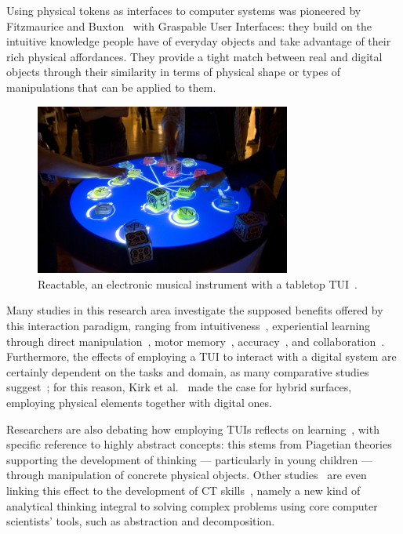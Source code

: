 Using physical tokens as interfaces to computer systems was pioneered by Fitzmaurice and Buxton~\cite{fitzmaurice1997graspable} with Graspable User Interfaces: they build on the intuitive knowledge people have of everyday objects and take advantage of their rich physical affordances. They provide a tight match between real and digital objects through their similarity in terms of physical shape or types of manipulations that can be applied to them.

\begin{figure}[ht!]
  \centering
  \includegraphics[width=0.75\textwidth]{images/c2/Reactable.jpg} 
  \caption{Reactable, an electronic musical instrument with a tabletop \acf{TUI}~\cite{jorda2007reactable}.}\label{fig:reactable}
\end{figure}

Many studies in this research area investigate the supposed benefits offered by this interaction paradigm, ranging from intuitiveness~\cite{Ishii:1997gy}, experiential learning through direct manipulation~\cite{Manches:2009kg, Parkes:2008bu}, motor memory~\cite{Weiss:2009ct}, accuracy~\cite{Muller:2014kx}, and collaboration~\cite{Subramanian:2007kx}. Furthermore, the effects of employing a \ac{TUI} to interact with a digital system are certainly dependent on the tasks and domain, as many comparative studies suggest~\cite{Weiss:2009ct, Muller:2014kx, Hancock:2009bg}; for this reason, Kirk et al.~\cite{Kirk:2009ue} made the case for hybrid surfaces, employing physical elements together with digital ones.

Researchers are also debating how em\-ploy\-ing \acp{TUI} re\-flects on learn\-ing~\cite{Horn:2009be,Marshall:2007dr,Antle:2013ho}, with spe\-cif\-ic ref\-er\-ence to highly abstract concepts: this stems from Piagetian theories~\cite{Piaget:1969vq} supporting the development of thinking --- particularly in young children --- through manipulation of concrete physical objects. Other studies~\cite{Wang:2014jy,Horn:2011ch} are even linking this effect to the development of \ac{CT} skills~\cite{Wing:2006iz}, namely a new kind of analytical thinking integral to solving complex problems using core computer scientists' tools, such as abstraction and decomposition.

